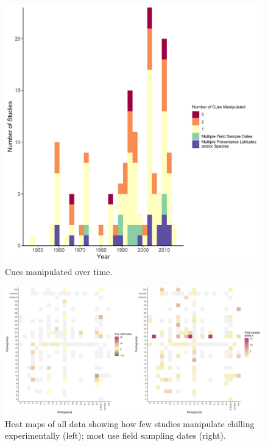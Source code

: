 \documentclass[11pt,letter]{article}
\begin{document}
\begin{figure}[t!]
\centering
\includegraphics[width=1\textwidth]{..//..//analyses/limitingcues/figures/studyyearcues.pdf}
\caption{Cues manipulated over time.}
  \label{fig:ts}
\end{figure}



\clearpage

\begin{figure}[t!]
\centering
\includegraphics[width=1.1\textwidth]{..//..//analyses/limitingcues/figures/heatmapphotoxforcexchill2panel.pdf}
\caption{Heat maps of all data showing how few studies manipulate chilling experimentally (left); most use field sampling dates (right).}
  \label{fig:heatmaps} 
\end{figure}
\end{document}
